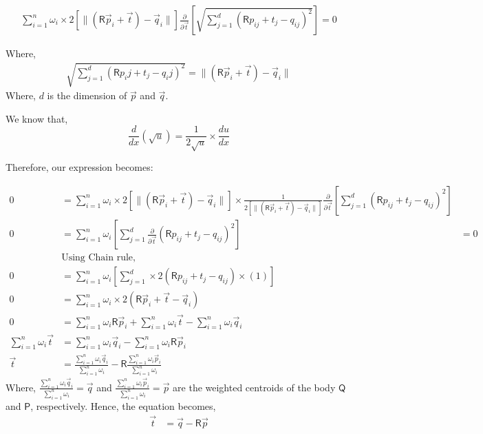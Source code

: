 \documentclass[a4paper, 11pt]{article}
\newcommand{\mat}[1]{\boldsymbol { \mathsf{#1}} }
\newcommand{\norm}[1]{\lVert#1\rVert}
\begin{document}
\begin{enumerate}[label=\alph*.]
    \begin{align}
         \sum_{i=1}^{n} \omega_i \times 2 \left[ \norm{(\mat R\vec p_i+\vec t)-\vec q_i} \right] \frac{\partial}{\partial \Vec{t}} \left[ \sqrt{\sum_{j=1}^d (\mat R p_{ij}+ t_j- q_{ij})^2} \right] = 0
    \end{align}
    
    Where,
    \begin{align} 
        \sqrt{\sum_{j=1}^d (\mat R p_ij+ t_j- q_ij)^2} = \norm{(\mat R\vec p_i+\vec t)-\vec q_i}
    \end{align}{}
    Where, $d$ is the dimension of $\vec p$ and $\vec q$.
    
    We know that,  $$\frac{d}{dx} (\sqrt{u}) = \frac{1}{2\sqrt{u}} \times \frac{du}{dx}$$
    
    Therefore, our expression becomes:
    
    \begin{align}
         0 &= \sum_{i=1}^{n} \omega_i \times 2 \left[ \norm{(\mat R\vec p_i+\vec t)-\vec q_i} \right] \times \frac{1}{2 \left[ \norm{(\mat R\vec p_i+\vec t)-\vec q_i} \right]} \frac{\partial}{\partial \Vec{t} } \left[ \sum_{j=1}^d (\mat R p_{ij}+ t_j- q_{ij})^2 \right]\\
         0 &= \sum_{i=1}^{n} \omega_i \left[ \sum_{j=1}^d \frac{\partial}{\partial \Vec{t} } (\mat R p_{ij}+ t_j- q_{ij})^2 \right] & = 0\\
         & \text{Using Chain rule,}\\
         0 &= \sum_{i=1}^{n} \omega_i \left[ \sum_{j=1}^d \times 2 (\mat R p_{ij}+ t_j - q_{ij}) \times (1) \right]\\
         0 &= \sum_{i=1}^{n} \omega_i  \times 2 (\mat R \vec p_i+ \vec t- \vec q_i)\\
         0 &= \sum_{i=1}^{n} \omega_i \mat R \vec p_i+ \sum_{i=1}^{n} \omega_i \vec t - \sum_{i=1}^{n} \omega_i \vec q_i\\
         \sum_{i=1}^{n} \omega_i \vec t &= \sum_{i=1}^{n} \omega_i \vec q_i - \sum_{i=1}^{n} \omega_i \mat R \vec p_i \\
         \vec t &= \frac{\sum_{i=1}^{n} \omega_i \vec q_i}{\sum_{i=1}^{n} \omega_i } - \mat R \frac{\sum_{i=1}^{n} \omega_i \vec p_i}{\sum_{i=1}^{n} \omega_i}
    \end{align}
    Where, $\frac{\sum_{i=1}^{n} \omega_i \vec q_i}{\sum_{i=1}^{n} \omega_i } = \vec q$ and $\frac{\sum_{i=1}^{n} \omega_i \vec p_i}{\sum_{i=1}^{n} \omega_i} = \vec p$ are the weighted centroids of the body $\mat Q$ and $\mat P$, respectively. Hence, the equation becomes,
    \begin{align}
        \vec t &= \vec q - \mat R \vec p
    \end{align}
    

\end{enumerate}
\end{document}

